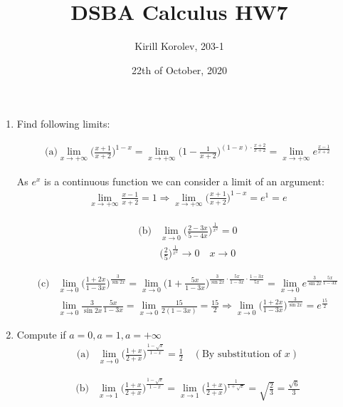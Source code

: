 \documentclass{article}
\title{DSBA Calculus HW7}
\author{Kirill Korolev, 203-1}
\date{22th of October, 2020}
\begin{document}
	
\maketitle

\begin{enumerate}
\item Find following limits:

\begin{align*}
\text{(a)} \lim_{x \to +\infty} \bigg(\frac{x+1}{x+2}\bigg)^{1-x}=\lim_{x \to +\infty} \bigg(1 - \frac{1}{x+2}\bigg)^{(1-x) \cdot \frac{x+2}{x+2}} = \lim_{x \to +\infty} e^{\frac{x-1}{x+2}}
\end{align*}

As $e^x$ is a continuous function we can consider a limit of an argument:
\begin{align*}
\lim_{x \to +\infty} \frac{x-1}{x+2} = 1 \Rightarrow
\lim_{x \to +\infty} \bigg(\frac{x+1}{x+2}\bigg)^{1-x} = e^1 = e
\end{align*}

\begin{align*}
\text{(b)} &\lim_{x \to 0} \bigg(\frac{2-3x}{5-4x}\bigg)^{\frac{1}{x^2}} = 0\\
&\bigg(\frac{2}{5}\bigg)^{\frac{1}{x^2}} \to 0 \quad x \to 0
\end{align*}

\begin{align*}
\text{(c)} &\lim_{x \to 0} \bigg(\frac{1+2x}{1-3x}\bigg)^{\frac{3}{\sin{2x}}}=\lim_{x \to 0} \bigg(1+\frac{5x}{1-3x}\bigg)^{\frac{3}{\sin{2x}} \cdot \frac{5x}{1-3x} \cdot \frac{1-3x}{5x}} = \lim_{x \to 0} e^{\frac{3}{\sin{2x}}\frac{5x}{1-3x}}\\
&\lim_{x \to 0} \frac{3}{\sin{2x}}\frac{5x}{1-3x} = \lim_{x \to 0} \frac{15}{2(1-3x)} = \frac{15}{2} \Rightarrow \lim_{x \to 0} \bigg(\frac{1+2x}{1-3x}\bigg)^{\frac{3}{\sin{2x}}} = e^{\frac{15}{2}}
\end{align*}

\item Compute if $a=0, a=1, a=+\infty$
\begin{align*}
\text{(a)} &\lim_{x \to 0} \bigg(\frac{1+x}{2+x}\bigg)^{\frac{1-\sqrt{x}}{1-x}} = \frac{1}{2} \quad (\text{By substitution of } x)
\end{align*}

\begin{align*}
\text{(b)} &\lim_{x \to 1} \bigg(\frac{1+x}{2+x}\bigg)^{\frac{1-\sqrt{x}}{1-x}} = \lim_{x \to 1} \bigg(\frac{1+x}{2+x}\bigg)^{\frac{1}{1+\sqrt{x}}} = \sqrt{\frac{2}{3}} = \frac{\sqrt{6}}{3}
\end{align*}



\end{enumerate}
\end{document}
